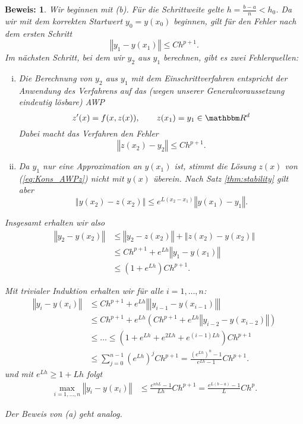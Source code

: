 \documentclass[12pt,a4paper]{book}
\theoremstyle{break}
\theoremstyle{nonumberplain}
\newtheorem{beweis}{Beweis:}
\newcommand{\R}{\mathbbm R}
\newcommand{\norm}[1]{\left\Vert#1\right\Vert}		%
\newcommand{\1}{\mathbbm{1}} 			      	%
\newcommand{\labeq}[1]{\label{eq:#1}}			%
\newcommand{\req}[1]{(\ref{eq:#1})}
\begin{document}
\begin{beweis}
Wir beginnen mit (b). Für die Schrittweite gelte $h=\frac{b-a}{n}<h_0$.
Da wir mit dem korrekten Startwert $y_0=y(x_0)$ beginnen, gilt für den Fehler nach dem ersten Schritt
\[
\norm{y_1-y(x_1)}\leq C h^{p+1}.
\]
Im nächsten Schritt, bei dem wir $y_2$ aus $y_1$ berechnen, gibt es zwei Fehlerquellen:
\begin{enumerate}[(i)]
\item Die Berechnung von $y_2$ aus $y_1$ mit dem Einschrittverfahren entspricht der Anwendung des 
Verfahrens auf das (wegen unserer Generalvoraussetzung eindeutig lösbare) AWP 
\begin{equation}\labeq{Kons_AWPz}
z'(x)=f(x,z(x)), \qquad z(x_1)=y_1\in \R^d
\end{equation}
Dabei macht das Verfahren den Fehler
\[
\norm{z(x_2)-y_2}\leq C h^{p+1}.
\]

\item Da $y_1$ nur eine Approximation an $y(x_1)$ ist, stimmt die Lösung $z(x)$ von \req{Kons_AWPz}
nicht mit $y(x)$ überein. Nach Satz \ref{thm:stability} gilt aber
\[
\norm{y(x_2)-z(x_2)} \leq e^{L (x_2-x_1)} \norm{y(x_1)-y_1}.
\]
\end{enumerate}

Insgesamt erhalten wir also
\begin{align*}
\norm{y_2-y(x_2)} &\leq \norm{y_2-z(x_2)} + \norm{z(x_2)-y(x_2)}\\
&\leq  C h^{p+1} + e^{Lh} \norm{y_1-y(x_1)}\\
&\leq  (1 + e^{Lh}) C h^{p+1}.
\end{align*}

Mit trivialer Induktion erhalten wir für alle $i=1,\ldots,n$:
\begin{align*}
\norm{y_i-y(x_i)} &\leq C h^{p+1} + e^{Lh} \norm{|y_{i-1}-y(x_{i-1})|} \\
&\leq C h^{p+1} + e^{Lh} \left( C h^{p+1} + e^{Lh} \norm{y_{i-2}-y(x_{i-2})} \right)  \\
&\leq \ldots \leq  \left( 1+ e^{Lh} + e^{2Lh} + e^{(i-1) Lh} \right) C h^{p+1}\\
& \leq \sum_{j=0}^{n-1} \left(e^{Lh}\right)^{j}  C h^{p+1}
= \frac{(e^{Lh})^n-1}{e^{Lh}-1} C h^{p+1}.
\end{align*}
und mit $e^{Lh}\geq 1+Lh$ folgt 
\begin{align*}
\max_{i=1,\ldots,n} \norm{y_i-y(x_i)}&\leq  \frac{e^{nhL}-1}{Lh} C h^{p+1}= \frac{e^{L(b-a)}-1}{L} C h^{p}.
\end{align*}

Der Beweis von (a) geht analog.
\end{beweis}
\end{document}
